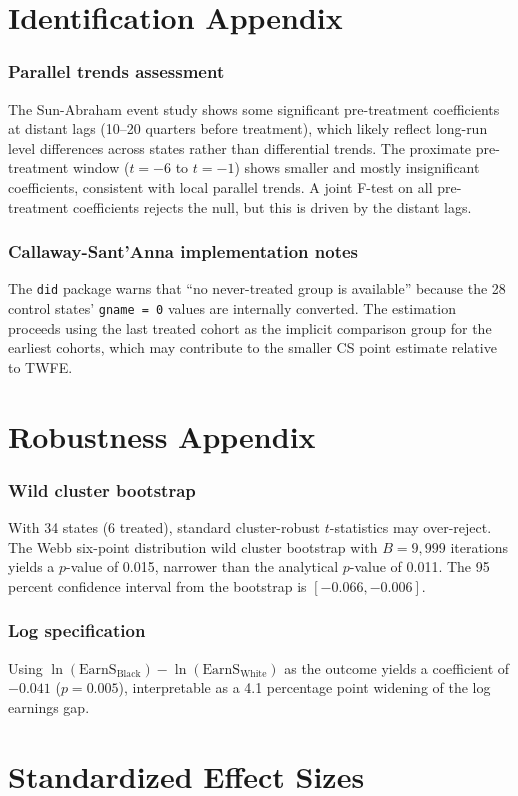 \documentclass[12pt]{article}
\begin{document}
\section{Identification Appendix}
\label{app:id}

\subsubsection*{Parallel trends assessment}

The Sun-Abraham event study shows some significant pre-treatment coefficients at distant lags (10--20 quarters before treatment), which likely reflect long-run level differences across states rather than differential trends. The proximate pre-treatment window ($t = -6$ to $t = -1$) shows smaller and mostly insignificant coefficients, consistent with local parallel trends. A joint F-test on all pre-treatment coefficients rejects the null, but this is driven by the distant lags.

\subsubsection*{Callaway-Sant'Anna implementation notes}

The \texttt{did} package warns that ``no never-treated group is available'' because the 28 control states' \texttt{gname = 0} values are internally converted. The estimation proceeds using the last treated cohort as the implicit comparison group for the earliest cohorts, which may contribute to the smaller CS point estimate relative to TWFE.


\section{Robustness Appendix}
\label{app:robust}

\subsubsection*{Wild cluster bootstrap}

With 34 states (6 treated), standard cluster-robust $t$-statistics may over-reject. The Webb six-point distribution wild cluster bootstrap with $B = 9{,}999$ iterations yields a $p$-value of 0.015, narrower than the analytical $p$-value of 0.011. The 95 percent confidence interval from the bootstrap is $[-0.066, -0.006]$.

\subsubsection*{Log specification}

Using $\ln(\text{EarnS}_{\text{Black}}) - \ln(\text{EarnS}_{\text{White}})$ as the outcome yields a coefficient of $-0.041$ ($p = 0.005$), interpretable as a 4.1 percentage point widening of the log earnings gap.


\section{Standardized Effect Sizes}
\label{sec:sde}


\end{document}
